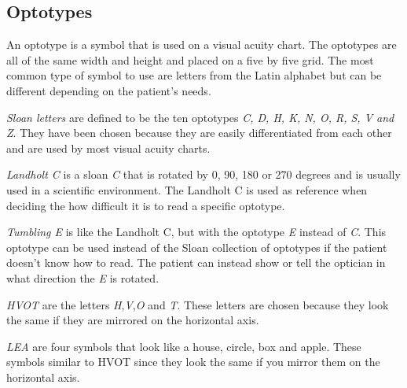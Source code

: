 \documentclass[12pt,a4paper,notitlepage]{report}
\begin{document}
\subsection{Optotypes} \label{Optotypes}
An optotype is a symbol that is used on a visual acuity chart. The optotypes are all of the same width and height and placed on a five by five grid. The most common type of symbol to use are letters from the Latin alphabet but can be different depending on the patient's needs\cite{Colenbrander}.

\textit{Sloan letters} are defined to be the ten optotypes \textit{C, D, H, K, N, O, R, S, V and Z}. They have been chosen because they are easily differentiated from each other \cite{Ferris} and are used by most visual acuity charts\cite{Colenbrander}.

\textit{Landholt C} is a sloan \textit{C} that is rotated by 0, 90, 180 or 270 degrees and is usually used in a scientific environment. The Landholt C is used as reference when deciding the how difficult it is to read a specific optotype\cite{Colenbrander}.

\textit{Tumbling E} is like the Landholt C, but with the optotype \textit{E} instead of \textit{C}. This optotype can be used instead of the Sloan collection of optotypes if the patient doesn't know how to read. The patient can instead show or tell the optician in what direction the \textit{E} is rotated\cite{Colenbrander}.

\textit{HVOT} are the letters \textit{H},\textit{V},\textit{O} and \textit{T}. These letters are chosen because they look the same if they are mirrored on the horizontal axis.

\textit{LEA} are four symbols that look like a house, circle, box and apple. These symbols similar to HVOT since they look the same if you mirror them on the horizontal axis.
\end{document}
